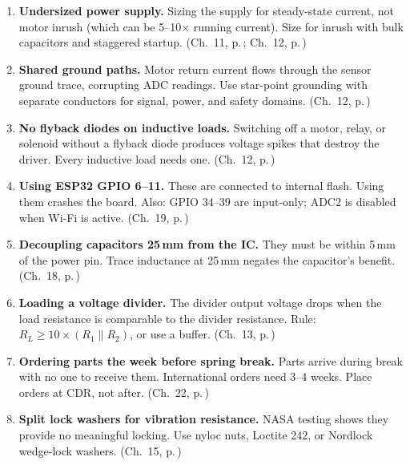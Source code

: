 \begin{enumerate}[leftmargin=1.5em,resume]

\item \textbf{Undersized power supply.} Sizing the supply for steady-state current, not motor inrush (which can be 5--10$\times$ running current). Size for inrush with bulk capacitors and staggered startup. (Ch.~11, p.\,\pageref{ch:motors}; Ch.~12, p.\,\pageref{ch:power})

\item \textbf{Shared ground paths.} Motor return current flows through the sensor ground trace, corrupting ADC readings. Use star-point grounding with separate conductors for signal, power, and safety domains. (Ch.~12, p.\,\pageref{ch:power})

\item \textbf{No flyback diodes on inductive loads.} Switching off a motor, relay, or solenoid without a flyback diode produces voltage spikes that destroy the driver. Every inductive load needs one. (Ch.~12, p.\,\pageref{ch:power})

\item \textbf{Using ESP32 GPIO 6--11.} These are connected to internal flash. Using them crashes the board. Also: GPIO 34--39 are input-only; ADC2 is disabled when Wi-Fi is active. (Ch.~19, p.\,\pageref{ch:mcu})

\item \textbf{Decoupling capacitors 25\,mm from the IC.} They must be within 5\,mm of the power pin. Trace inductance at 25\,mm negates the capacitor's benefit. (Ch.~18, p.\,\pageref{ch:pcb})

\item \textbf{Loading a voltage divider.} The divider output voltage drops when the load resistance is comparable to the divider resistance. Rule: $R_L \geq 10 \times (R_1 \| R_2)$, or use a buffer. (Ch.~13, p.\,\pageref{ch:electronics})

\item \textbf{Ordering parts the week before spring break.} Parts arrive during break with no one to receive them. International orders need 3--4 weeks. Place orders at CDR, not after. (Ch.~22, p.\,\pageref{ch:cdr})

\item \textbf{Split lock washers for vibration resistance.} NASA testing shows they provide no meaningful locking. Use nyloc nuts, Loctite 242, or Nordlock wedge-lock washers. (Ch.~15, p.\,\pageref{ch:fasteners})

\end{enumerate}

